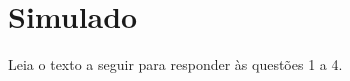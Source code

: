 





\chapter[Simulado 4]{Simulado}


\noindent Leia o texto a seguir para responder às questões 1 a 4.

